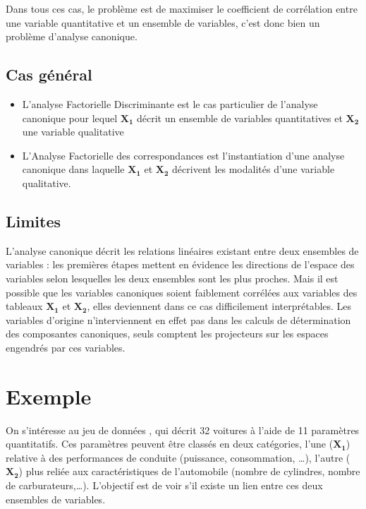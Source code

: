 \documentclass[letterpaper,10pt,french]{sphinxmanual}
\begin{document}
\sphinxAtStartPar
Dans tous ces cas, le problème est de maximiser le coefficient de corrélation entre une variable quantitative et un ensemble de variables, c’est donc bien un problème d’analyse canonique.


\subsection{Cas général}
\label{\detokenize{canonique:cas-general}}\begin{itemize}
\item {} 
\sphinxAtStartPar
L’analyse Factorielle Discriminante est le cas particulier de l’analyse canonique  pour lequel \(\mathbf{X_1}\) décrit un ensemble de variables quantitatives et \(\mathbf{X_2}\) une variable qualitative

\item {} 
\sphinxAtStartPar
L’Analyse Factorielle des correspondances est l’instantiation d’une analyse canonique dans laquelle \(\mathbf{X_1}\)  et \(\mathbf{X_2}\) décrivent les modalités d’une variable qualitative.

\end{itemize}


\subsection{Limites}
\label{\detokenize{canonique:limites}}
\sphinxAtStartPar
L’analyse canonique décrit les relations linéaires existant entre deux ensembles de variables : les premières étapes mettent en évidence les directions de l’espace des variables selon lesquelles les deux ensembles sont les plus proches. Mais il est possible que les variables canoniques soient faiblement corrélées aux variables des tableaux \(\mathbf{X_1}\)  et \(\mathbf{X_2}\), elles deviennent dans ce cas  difficilement interprétables. Les variables d’origine n’interviennent en effet pas dans les calculs de détermination des composantes canoniques, seuls comptent les projecteurs sur les espaces engendrés par ces variables.


\section{Exemple}
\label{\detokenize{canonique:exemple}}
\sphinxAtStartPar
On s’intéresse au jeu de données , qui décrit 32 voitures à l’aide de 11 paramètres quantitatifs. Ces paramètres peuvent être classés en deux catégories, l’une  (\(\mathbf{X_1}\)) relative à des performances de conduite (puissance, consommation, …), l’autre  (\(\mathbf{X_2}\)) plus reliée aux caractéristiques de l’automobile (nombre de cylindres, nombre de carburateurs,…). L’objectif est de voir s’il existe un lien entre ces deux ensembles de variables.
\end{document}
